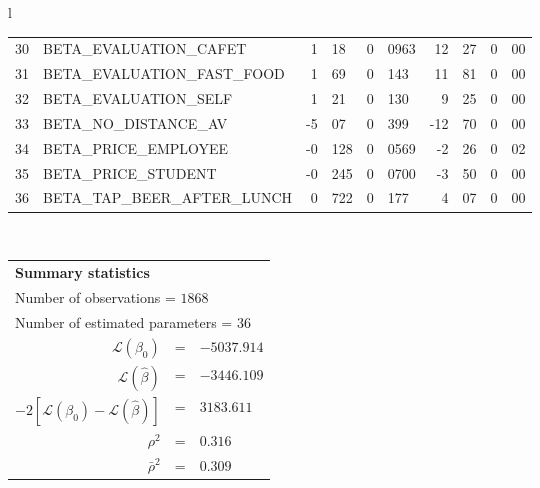 \begin{tabular}{l}
\begin{tabular}{rlr@{.}lr@{.}lr@{.}lr@{.}l}
30 & BETA_EVALUATION_CAFET & 1&18 & 0&0963 & 12&27 & 0&00\\
31 & BETA_EVALUATION_FAST_FOOD & 1&69 & 0&143 & 11&81 & 0&00\\
32 & BETA_EVALUATION_SELF & 1&21 & 0&130 & 9&25 & 0&00\\
33 & BETA_NO_DISTANCE_AV & -5&07 & 0&399 & -12&70 & 0&00\\
34 & BETA_PRICE_EMPLOYEE & -0&128 & 0&0569 & -2&26 & 0&02\\
35 & BETA_PRICE_STUDENT & -0&245 & 0&0700 & -3&50 & 0&00\\
36 & BETA_TAP_BEER_AFTER_LUNCH & 0&722 & 0&177 & 4&07 & 0&00\\
\hline
\end{tabular}
\\
\begin{tabular}{rcl}
\multicolumn{3}{l}{\bf Summary statistics}\\
\multicolumn{3}{l}{ Number of observations = $1868$} \\
\multicolumn{3}{l}{ Number of estimated  parameters = $36$} \\
 $\mathcal{L}(\beta_0)$ &=&  $-5037.914$ \\
 $\mathcal{L}(\hat{\beta})$ &=& $-3446.109 $  \\
 $-2[\mathcal{L}(\beta_0) -\mathcal{L}(\hat{\beta})]$ &=& $3183.611$ \\
    $\rho^2$ &=&   $0.316$ \\
    $\bar{\rho}^2$ &=&    $0.309$ \\
\end{tabular}
  \end{tabular}
